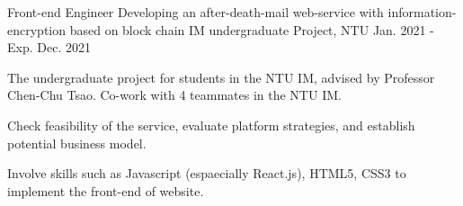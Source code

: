 \begin{cventries}
  \cventry
    {Front-end Engineer} %
    {Developing an after-death-mail web-service with information-encryption based on block chain} %
    {IM undergraduate Project, NTU} %
    {Jan. 2021 - Exp. Dec. 2021} %
    {
      \begin{cvitems} %
        \item {The undergraduate project for students in the NTU IM, advised by Professor Chen-Chu Tsao. Co-work with 4 teammates in the NTU IM.}
        \item {Check feasibility of the service, evaluate platform strategies, and establish potential business model.}
        \item {Involve skills such as Javascript (espaecially React.js), HTML5, CSS3 to implement the front-end of website.}
      \end{cvitems}
    }    

\end{cventries}

